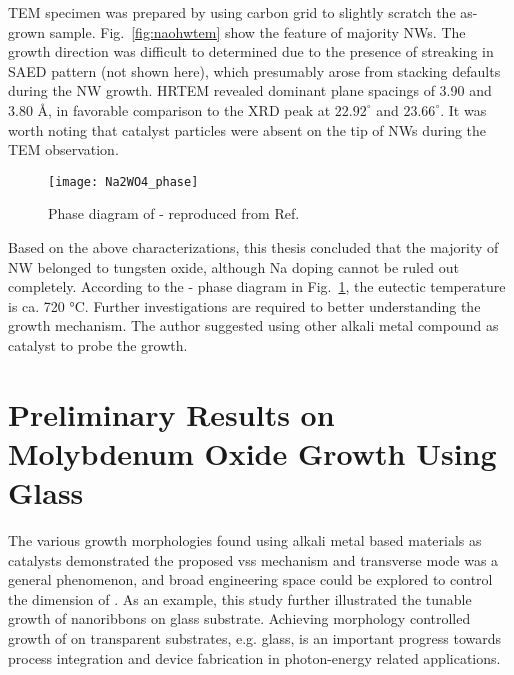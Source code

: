 TEM specimen was prepared by using carbon grid to slightly scratch the as-grown sample. Fig.~\ref{fig:naohwtem} show the feature of majority NWs. The growth direction was difficult to determined due to the presence of streaking in SAED pattern (not shown here), which presumably arose from stacking defaults during the NW growth. HRTEM revealed dominant plane spacings of 3.90 and 3.80 \si{\angstrom}, in favorable comparison to the XRD peak at $22.92^\circ$ and $23.66^\circ$. It was worth noting that catalyst particles were absent on the tip of NWs during the TEM observation. 
\begin{figure}[htb]
\centering
\texttt{[image: Na2WO4\_phase]}
\caption[Phase diagram of -]{Phase diagram of - reproduced from Ref.~\cite{Hoermann1929}}
\label{fig:nawopd}
\end{figure}
Based on the above characterizations, this thesis concluded that the majority of NW belonged to tungsten oxide, although Na doping cannot be ruled out completely. According to the - phase diagram in Fig.~\ref{fig:nawopd}, the eutectic temperature is ca. 720 \si{\degreeCelsius}.\cite{Mann2007} Further investigations are required to better understanding the growth mechanism. The author suggested using other alkali metal compound as catalyst to probe the  growth. 

\section{Preliminary Results on Molybdenum Oxide Growth Using Glass}\label{sec:mogls}

The various growth morphologies found using alkali metal based materials as catalysts demonstrated the proposed \gls{vss} mechanism and transverse mode was a general phenomenon, and broad engineering space could be explored to control the dimension of . As an example, this study further illustrated the tunable growth of  nanoribbons on glass substrate. Achieving morphology controlled growth of  on transparent substrates, e.g. glass, is an important progress towards process integration and device fabrication in photon-energy related applications. 


